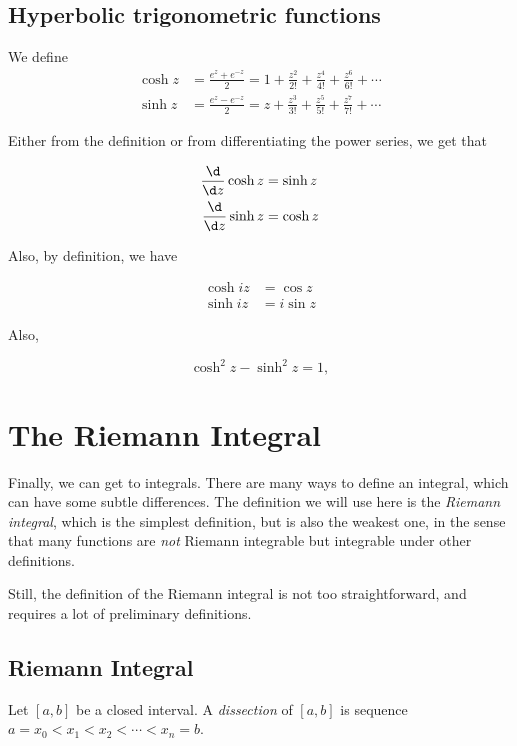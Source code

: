 \documentclass[a4paper]{article}
\begin{document}
\subsection{Hyperbolic trigonometric functions}
\begin{defi}
  We define
  \begin{align*}
    \cosh z &= \frac{e^z + e^{-z}}{2} = 1 + \frac{z^2}{2!} + \frac{z^4}{4!} + \frac{z^6}{6!} + \cdots\\
    \sinh z &= \frac{e^z - e^{-z}}{2} = z + \frac{z^3}{3!} + \frac{z^5}{5!} + \frac{z^7}{7!} + \cdots
  \end{align*}
\end{defi}

Either from the definition or from differentiating the power series, we get that
\begin{prop}
  \begin{align*}
    \frac{\d}{\d z}\cosh z &= \sinh z\\
    \frac{\d }{\d z}\sinh z &= \cosh z
  \end{align*}
\end{prop}
Also, by definition, we have
\begin{prop}
  \begin{align*}
    \cosh iz &= \cos z\\
    \sinh iz &= i\sin z
  \end{align*}
\end{prop}
Also,
\begin{prop}
  \[
    \cosh^2 z - \sinh^2 z = 1,
  \]
\end{prop}
\section{The Riemann Integral}
Finally, we can get to integrals. There are many ways to define an integral, which can have some subtle differences. The definition we will use here is the \emph{Riemann integral}, which is the simplest definition, but is also the weakest one, in the sense that many functions are \emph{not} Riemann integrable but integrable under other definitions.

Still, the definition of the Riemann integral is not too straightforward, and requires a lot of preliminary definitions.
\subsection{Riemann Integral}
\begin{defi}[Dissections]
  Let $[a, b]$ be a closed interval. A \emph{dissection} of $[a, b]$ is sequence $a = x_0 < x_1 < x_2 < \cdots < x_n = b$.
\end{defi}
\end{document}
